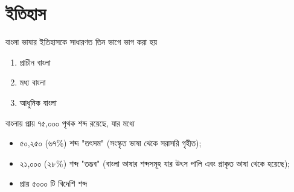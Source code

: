 \section{ইতিহাস}
বাংলা ভাষার ইতিহাসকে সাধারণত তিন ভাগে ভাগ করা হয়

\begin{enumerate}
    \item প্রাচীন বাংলা
    \item মধ্য বাংলা
    \item আধুনিক বাংলা
\end{enumerate}

বাংলায় প্রায় ৭৫,০০০ পৃথক শব্দ রয়েছে, যার মধ্যে

\begin{itemize}
    \item ৫০,২৫০ (৬৭\%) শব্দ "তৎসম" (সংস্কৃত ভাষা থেকে সরাসরি গৃহীত);
    \item ২১,০০০ (২৮\%) শব্দ "তদ্ভব" (বাংলা ভাষার শব্দসমূহ যার উৎস পালি এবং প্রাকৃত ভাষা থেকে হয়েছে);
    \item প্রায় ৫০০০ টি বিদেশি শব্দ
\end{itemize}